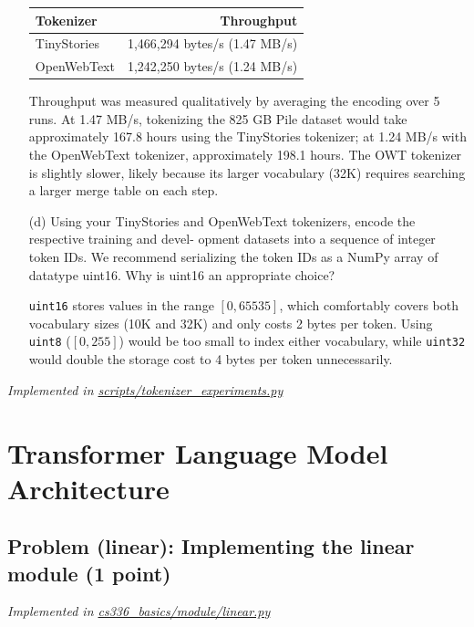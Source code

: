 \documentclass[letterpaper]{article}
\begin{document}
\begin{itemize}
\begin{center}
\begin{tabular}{lr}
\hline
\textbf{Tokenizer} & \textbf{Throughput} \\
\hline
TinyStories & 1,466,294 bytes/s (1.47 MB/s) \\
OpenWebText & 1,242,250 bytes/s (1.24 MB/s) \\
\hline
\end{tabular}
\end{center}

	Throughput was measured qualitatively by averaging the encoding over 5 runs. At 1.47 MB/s, tokenizing the 825 GB Pile dataset would take approximately 167.8 hours using the TinyStories tokenizer; at 1.24 MB/s with the OpenWebText tokenizer, approximately 198.1 hours. The OWT tokenizer is slightly slower, likely because its larger vocabulary (32K) requires searching a larger merge table on each step.

	\item[(d)] Using your TinyStories and OpenWebText tokenizers, encode the respective training and devel-
	opment datasets into a sequence of integer token IDs. We recommend serializing the token IDs as a NumPy array of datatype uint16. Why is uint16 an appropriate choice?

	\texttt{uint16} stores values in the range $[0, 65535]$, which comfortably covers both vocabulary sizes (10K and 32K) and only costs 2 bytes per token. Using \texttt{uint8} ($[0, 255]$) would be too small to index either vocabulary, while \texttt{uint32} would double the storage cost to 4 bytes per token unnecessarily.

\end{itemize}

\textit{Implemented in  \href{https://github.com/echung32/ece405-assignment1-basics/blob/main/scripts/tokenizer_experiments.py}{scripts/tokenizer\_experiments.py}}

\section{Transformer Language Model Architecture}

\subsection{Problem (linear): Implementing the linear module (1 point)}

\textit{Implemented in  \href{https://github.com/echung32/ece405-assignment1-basics/blob/main/cs336_basics/module/linear.py}{cs336\_basics/module/linear.py}}
\end{document}
